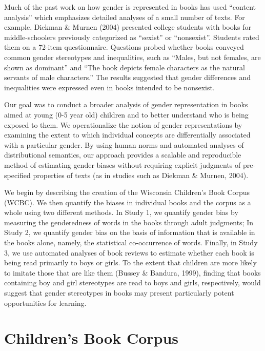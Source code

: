 \documentclass[
  english,
  ,man,floatsintext]{apa6}
\begin{document}
Much of the past work on how gender is represented in books has used \enquote{content analysis} which emphasizes detailed analyses of a small number of texts. For example, Diekman \& Murnen (2004) presented college students with books for middle-schoolers previously categorized as \enquote{sexist} or \enquote{nonsexist}. Students rated them on a 72-item questionnaire. Questions probed whether books conveyed common gender stereotypes and inequalities, such as \enquote{Males, but not females, are shown as dominant} and \enquote{The book depicts female characters as the natural servants of male characters.} The results suggested that gender differences and inequalities were expressed even in books intended to be nonsexist.

Our goal was to conduct a broader analysis of gender representation in books aimed at young (0-5 year old) children and to better understand who is being exposed to them. We operationalize the notion of gender representations by examining the extent to which individual concepts are differentially associated with a particular gender. By using human norms and automated analyses of distributional semantics, our approach provides a scalable and reproducible method of estimating gender biases without requiring explicit judgments of pre-specified properties of texts (as in studies such as Diekman \& Murnen, 2004).

We begin by describing the creation of the Wisconsin Children's Book Corpus (WCBC). We then quantify the biases in individual books and the corpus as a whole using two different methods. In Study 1, we quantify gender bias by measuring the genderedness of words in the books through adult judgments; In Study 2, we quantify gender bias on the basis of information that is available in the books alone, namely, the statistical co-occurrence of words. Finally, in Study 3, we use automated analyses of book reviews to estimate whether each book is being read primarily to boys or girls. To the extent that children are more likely to imitate those that are like them (Bussey \& Bandura, 1999), finding that books containing boy and girl stereotypes are read to boys and girls, respectively, would suggest that gender stereotypes in books may present particularly potent opportunities for learning.

\hypertarget{childrens-book-corpus}{%
\section{Children's Book Corpus}\label{childrens-book-corpus}}
\end{document}

